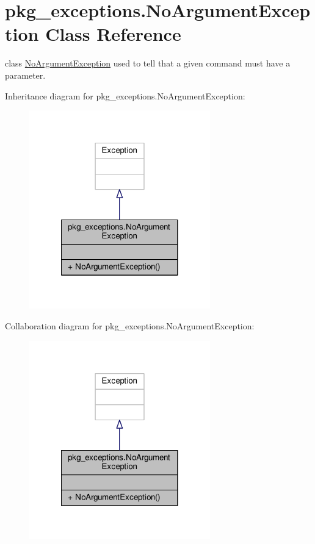 \hypertarget{classpkg__exceptions_1_1NoArgumentException}{\section{pkg\-\_\-exceptions.\-No\-Argument\-Exception Class Reference}
\label{classpkg__exceptions_1_1NoArgumentException}
}


class \hyperlink{classpkg__exceptions_1_1NoArgumentException}{No\-Argument\-Exception} used to tell that a given command must have a parameter.  




Inheritance diagram for pkg\-\_\-exceptions.\-No\-Argument\-Exception\-:
\nopagebreak
\begin{figure}[H]
\begin{center}
\leavevmode
\includegraphics[width=222pt]{classpkg__exceptions_1_1NoArgumentException__inherit__graph}
\end{center}
\end{figure}


Collaboration diagram for pkg\-\_\-exceptions.\-No\-Argument\-Exception\-:
\nopagebreak
\begin{figure}[H]
\begin{center}
\leavevmode
\includegraphics[width=222pt]{classpkg__exceptions_1_1NoArgumentException__coll__graph}
\end{center}
\end{figure}
